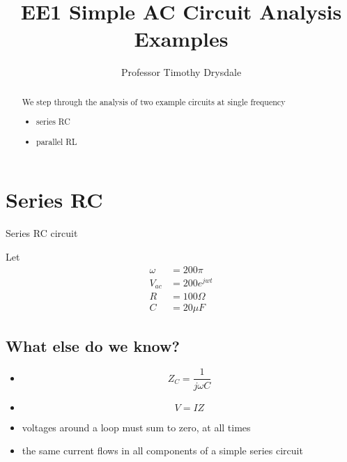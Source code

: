 \documentclass{tufte-handout}
\title{EE1 Simple AC Circuit Analysis Examples}
\author{Professor Timothy Drysdale}
\newcommand{\vac}{V_{ac}}%
\begin{document}
\maketitle


\begin{abstract}
\noindent
We step through the analysis of two example circuits at single frequency
\begin{itemize}
\item series RC
\item parallel RL
\end{itemize}
\end{abstract}

\section{Series RC}

\begin{marginfigure}

\caption{Series RC circuit}
\label{fig:seriesRC}
\end{marginfigure}

Let 
\begin{align}
\omega &= 200\pi \\
\vac & = 200e^{jwt}\\
R &= 100\Omega \\
C &= 20\mu F 
\end{align}

\subsection{What else do we know? }
\begin{itemize}
\item \[Z_C = \frac{1}{j\omega C}\]
\item \[ V = IZ \]
\item voltages around a loop must sum to zero, at all times
\item the same current flows in all components of a simple series circuit

\end{itemize}
\end{document}
